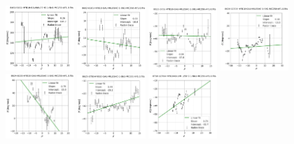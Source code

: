 \documentclass[fleqn,usenatbib]{mnras}
\begin{document}
\begin{figure}
    \includegraphics[width=0.23\textwidth]{Images/LINFITS/CC0-8461-9102-LINFIT-EBARS-MASKED.png}
    \includegraphics[width=0.23\textwidth]{Images/LINFITS/CC0-8602-6101-LINFIT-EBARS-MASKED.png}
    \includegraphics[width=0.23\textwidth]{Images/LINFITS/CC0-8623-3702-LINFIT-EBARS-MASKED.png}
    \includegraphics[width=0.23\textwidth]{Images/LINFITS/CC0-8624-12704-LINFIT-EBARS-MASKED.png}
    \includegraphics[width=0.23\textwidth]{Images/LINFITS/CC0-8624-6103-LINFIT-EBARS-MASKED.png}
    \includegraphics[width=0.23\textwidth]{Images/LINFITS/CC0-8625-3703-LINFIT-EBARS-MASKED.png}
    \includegraphics[width=0.23\textwidth]{Images/LINFITS/CC0-8716-12704-LINFIT-EBARS-MASKED.png}

\end{figure}
\end{document}
